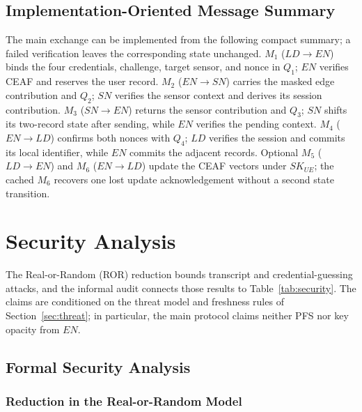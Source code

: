 \documentclass[cmc,article,submit,moreauthors,pdftex]{Definitions/tsp}
\begin{document}
\subsection{Implementation-Oriented Message Summary}
The main exchange can be implemented from the following compact summary; a failed verification leaves the corresponding state unchanged. $M_1$ ($LD\rightarrow EN$) binds the four credentials, challenge, target sensor, and nonce in $Q_1$; $EN$ verifies CEAF and reserves the user record. $M_2$ ($EN\rightarrow SN$) carries the masked edge contribution and $Q_2$; $SN$ verifies the sensor context and derives its session contribution. $M_3$ ($SN\rightarrow EN$) returns the sensor contribution and $Q_3$; $SN$ shifts its two-record state after sending, while $EN$ verifies the pending context. $M_4$ ($EN\rightarrow LD$) confirms both nonces with $Q_4$; $LD$ verifies the session and commits its local identifier, while $EN$ commits the adjacent records. Optional $M_5$ ($LD\rightarrow EN$) and $M_6$ ($EN\rightarrow LD$) update the CEAF vectors under $SK_{UE}$; the cached $M_6$ recovers one lost update acknowledgement without a second state transition.

\section{Security Analysis}\label{sec:security}

The Real-or-Random (ROR) reduction bounds transcript and credential-guessing attacks, and the informal audit connects those results to Table~\ref{tab:security}. The claims are conditioned on the threat model and freshness rules of Section~\ref{sec:threat}; in particular, the main protocol claims neither PFS nor key opacity from $EN$.

\subsection{Formal Security Analysis}\label{sec:formal}

\subsubsection{Reduction in the Real-or-Random Model}\label{sec:ror}
\end{document}
